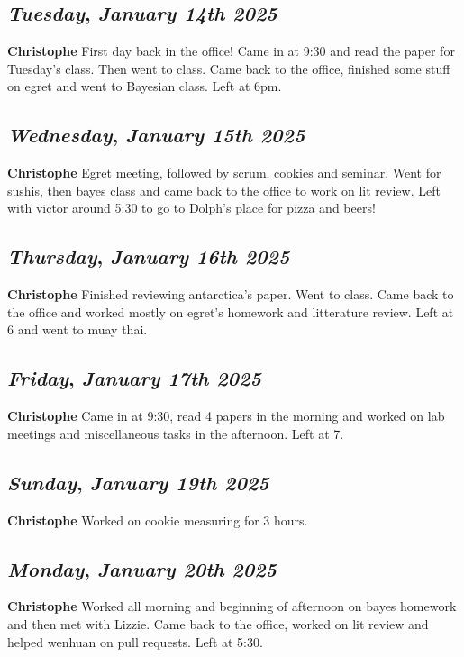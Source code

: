 \def\day{\textit{January 14th 2025}}
\def\weekday{\textit{Tuesday}}
\subsection*{\weekday, \day}
\textbf {Christophe}
First day back in the office!  Came in at 9:30 and read the paper for Tuesday's class. Then went to class. Came back to the office, finished some stuff on egret and went to Bayesian class. Left at 6pm.

\def\day{\textit{January 15th 2025}}
\def\weekday{\textit{Wednesday}}
\subsection*{\weekday, \day}
\textbf {Christophe}
Egret meeting, followed by scrum, cookies and seminar. Went for sushis, then bayes class and came back to the office to work on lit review. Left with victor around 5:30 to go to Dolph's place for pizza and beers!

\def\day{\textit{January 16th 2025}}
\def\weekday{\textit{Thursday}}
\subsection*{\weekday, \day}
\textbf {Christophe}
Finished reviewing antarctica's paper. Went to class. Came back to the office and worked mostly on egret's homework and litterature review. Left at 6 and went to muay thai.

\def\day{\textit{January 17th 2025}}
\def\weekday{\textit{Friday}}
\subsection*{\weekday, \day}
\textbf {Christophe}
Came in at 9:30, read 4 papers in the morning and worked on lab meetings and miscellaneous tasks in the afternoon. Left at 7.

\def\day{\textit{January 19th 2025}}
\def\weekday{\textit{Sunday}}
\subsection*{\weekday, \day}
\textbf {Christophe}
Worked on cookie measuring for 3 hours.

\def\day{\textit{January 20th 2025}}
\def\weekday{\textit{Monday}}
\subsection*{\weekday, \day}
\textbf {Christophe}
Worked all morning and beginning of afternoon on bayes homework and then met with Lizzie. Came back to the office, worked on lit review and helped wenhuan on pull requests. Left at 5:30.


